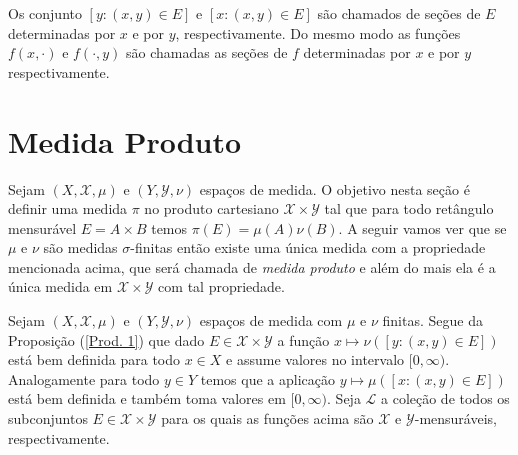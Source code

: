 \begin{observacao}
Os conjunto $[y: (x,y)\in E]$ e $[x: (x,y)\in E]$ 
são chamados de seções de $E$ determinadas por $x$ e 
por $y$, respectivamente. Do mesmo modo as funções $f(x, \cdot)$ e $f(\cdot, y)$ 
são chamadas as seções de $f$ determinadas por $x$ e por $y$ respectivamente.
\end{observacao}



\section{Medida Produto}
Sejam $(X, \mathscr{X}, \mu)$ e $(Y, \mathscr{Y}, \nu)$
espaços de medida. 
O objetivo nesta seção é definir uma medida $\pi$ no produto cartesiano 
$\mathscr{X}\times \mathscr{Y}$ tal que para todo 
retângulo mensurável $E=A\times B$ temos  
$\pi(E)=\mu(A)\nu(B)$. 
A seguir vamos ver que se 
$ \mu$ e $\nu$ são medidas $\sigma$-finitas então 
existe uma única medida com a propriedade mencionada acima, 
que será chamada de \emph{medida produto} e além do mais 
ela é a única medida em $\mathscr{X}\times\mathscr{Y}$ 
com tal propriedade.
\medskip
 

Sejam $(X, \mathscr{X}, \mu)$ e $(Y, \mathscr{Y}, \nu)$
espaços de medida com $\mu$ e $\nu$ finitas. 
Segue  da Proposição (\ref{Prod. 1}) que dado
$E\in \mathscr{X}\times \mathscr{Y}$ a função 
$x\mapsto \nu([y:(x,y)\in E])$ está bem definida 
para todo $x\in X$ e assume valores no intervalo $[0, \infty)$.
Analogamente para todo $y\in Y$ temos que a 
aplicação $y\mapsto \mu([x:(x,y)\in E])$ 
está bem definida e também toma valores em $[0, \infty)$.
Seja $\mathscr{L}$ a coleção de todos os subconjuntos 
$E\in \mathscr{X}\times \mathscr{Y}$
para os quais as funções acima são $\mathscr{X}$ e $\mathscr{Y}$-mensuráveis,
respectivamente.

